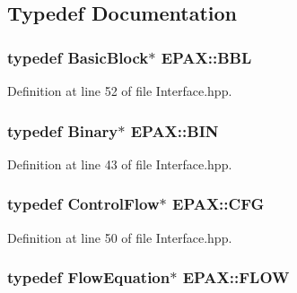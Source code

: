 \subsection{\-Typedef \-Documentation}
\hypertarget{namespace_e_p_a_x_a0ad4f6573b03fa5c375bed0e68d4fab0}{
\subsubsection[{\-B\-B\-L}]{\setlength{\rightskip}{0pt plus 5cm}typedef \-Basic\-Block$\ast$ {\bf \-E\-P\-A\-X\-::\-B\-B\-L}}}\label{namespace_e_p_a_x_a0ad4f6573b03fa5c375bed0e68d4fab0}


\-Definition at line 52 of file \-Interface.\-hpp.

\hypertarget{namespace_e_p_a_x_ad71db9d891528e4a8b303787dff8ac0b}{
\subsubsection[{\-B\-I\-N}]{\setlength{\rightskip}{0pt plus 5cm}typedef \-Binary$\ast$ {\bf \-E\-P\-A\-X\-::\-B\-I\-N}}}\label{namespace_e_p_a_x_ad71db9d891528e4a8b303787dff8ac0b}


\-Definition at line 43 of file \-Interface.\-hpp.

\hypertarget{namespace_e_p_a_x_a6edfef502c4f06240ec12097855e17dd}{
\subsubsection[{\-C\-F\-G}]{\setlength{\rightskip}{0pt plus 5cm}typedef \-Control\-Flow$\ast$ {\bf \-E\-P\-A\-X\-::\-C\-F\-G}}}\label{namespace_e_p_a_x_a6edfef502c4f06240ec12097855e17dd}


\-Definition at line 50 of file \-Interface.\-hpp.

\hypertarget{namespace_e_p_a_x_a289a37f4d34ed51ee92cbd8c601db421}{
\subsubsection[{\-F\-L\-O\-W}]{\setlength{\rightskip}{0pt plus 5cm}typedef \-Flow\-Equation$\ast$ {\bf \-E\-P\-A\-X\-::\-F\-L\-O\-W}}}\label{namespace_e_p_a_x_a289a37f4d34ed51ee92cbd8c601db421}


